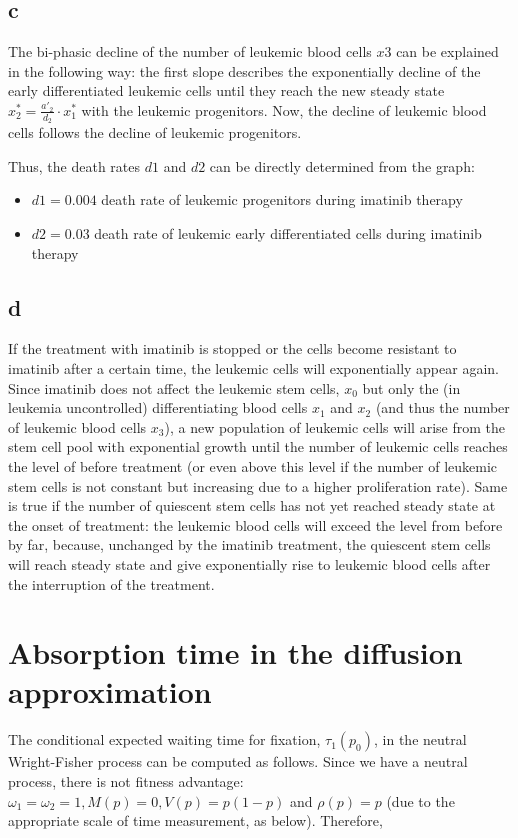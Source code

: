 \subsection{c}

The bi-phasic decline of the number of leukemic blood cells $x3$ can be explained in the
following way: the first slope describes the exponentially decline of the early differentiated leukemic
cells until they reach the new steady state $x^*_2 = \frac{a'_2}{d_2} \cdot x^*_1$ with the leukemic progenitors. Now, the decline of leukemic blood cells follows the decline of leukemic progenitors. 

Thus, the death rates $d1$ and $d2$ can be directly determined from the graph:
\begin{itemize}
\item $d1 = 0.004$  death rate of leukemic progenitors during imatinib therapy
\item $d2 = 0.03$  death rate of leukemic early differentiated cells during imatinib therapy
\end{itemize}

\subsection{d}

If the treatment with imatinib is stopped or the cells become resistant to imatinib after a certain time, the leukemic cells will exponentially appear again. Since imatinib does not affect the leukemic stem cells, $x_0$ but only the (in leukemia uncontrolled) differentiating blood cells $x_1$ and $x_2$ (and thus the number of leukemic blood cells $x_3$), a new population of leukemic cells will arise from the stem cell pool with exponential growth until the number of leukemic cells reaches the level of before treatment (or even above this level if the number of leukemic stem cells is not constant but increasing due to a higher proliferation rate).
Same is true if the number of quiescent stem cells has not yet reached steady state at the onset of treatment: the leukemic blood cells will exceed the level from before by far, because, unchanged by the imatinib treatment, the quiescent stem cells will reach steady state and give exponentially rise to leukemic blood cells after the interruption of the treatment.

\setcounter{chapter}{6}
\setcounter{section}{0}
\section{Absorption time in the diffusion approximation}
The conditional expected waiting time for fixation, $\tau_1(p_0)$, in the neutral Wright-Fisher process can be computed as follows. Since we have a neutral process, there is not fitness advantage: $\omega_1 = \omega_2 = 1, M(p)=0, V(p) = p(1-p)$ and $\rho(p) = p$ (due to the appropriate scale of time measurement, as below).
Therefore,

